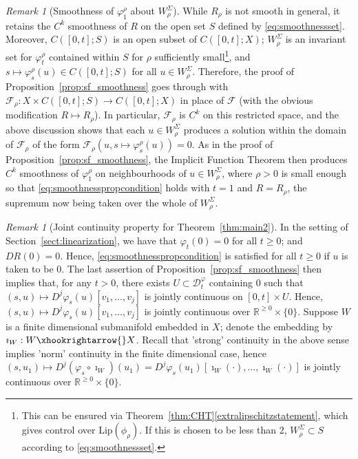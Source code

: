 \documentclass[a4paper, 12pt, oneside, reqno, notitlepage]{amsart}
\theoremstyle{plain}
\theoremstyle{definition}
\theoremstyle{remark}
\newtheorem{remark}[theorem]{Remark}
\newcommand{\lip}{\mathrm{Lip}}
\begin{document}
\begin{remark}[Smoothness of $\varphi_1^\rho$ about $W^\Sigma_\rho$] \label{remark:cutoff_semiflow_smoothness}
    While $R_\rho$ is not smooth in general, it retains the $C^k$ smoothness of $R$ on the open set $S$ defined by \eqref{eq:smoothnessset}.
    Moreover, $C([0,t];S)$ is an open subset of $C([0,t];X)$; $W^\Sigma_\rho$ is an invariant set for $\varphi_t^\rho$ contained within $S$ for $\rho$ sufficiently small\footnote{This can be ensured via Theorem~\ref{thm:CHT}\ref{extralipschitzstatement}, which gives control over $\lip(\phi_\rho)$. If this is chosen to be less than $2$, $W^\Sigma_\rho \subset S$ according to \eqref{eq:smoothnessset}.}, and $s \mapsto \varphi_s^\rho(u) \in C([0,t];S)$ for all $u \in W^\Sigma_\rho$. 
    Therefore, the proof of Proposition~\ref{prop:sf_smoothness} goes through with $\mathcal{F}_\rho : X \times C([0,t];S) \to C([0,t];X)$ in place of $\mathcal{F}$ (with the obvious modification $R \mapsto R_\rho$).
    In particular, $\mathcal{F}_\rho$ is $C^k$ on this restricted space, and the above discussion shows that each $u \in W^\Sigma_\rho$ produces a solution within the domain of $\mathcal{F}_\rho$ of the form $\mathcal{F}_\rho (u, s \mapsto \varphi^\rho_s(u)) =0$.
    As in the proof of Proposition~\ref{prop:sf_smoothness}, the Implicit Function Theorem then produces $C^k$ smoothness of $\varphi_1^\rho$ on neighbourhoods of $u \in W^\Sigma_\rho$, where $\rho >0$ is small enough so that \eqref{eq:smoothnesspropcondition} holds with $t =1 $ and $R = R_\rho$, the supremum now being taken over the whole of $W^\Sigma_\rho$.
\end{remark}


\begin{remark}[Joint continuity property for Theorem~\ref{thm:main2}] \label{remark:jointcont}
    In the setting of Section~\ref{sect:linearization}, we have that $\varphi_t(0) = 0$ for all $t \geq 0$; and $DR(0) = 0$.
    Hence, \eqref{eq:smoothnesspropcondition} is satisfied for all $t \geq 0$ if $u$ is taken to be $0$.
    The last assertion of Proposition~\ref{prop:sf_smoothness} then implies that, for any $t > 0$, there exists $U \subset \mathcal{D}_t^\varphi$ containing $0$ such that $(s,u) \mapsto D^j\varphi_s(u)[v_1,\ldots,v_j]$ is jointly continuous on $[0,t] \times U$.
    Hence,  $(s,u) \mapsto D^j\varphi_s(u)[v_1,\ldots,v_j]$ is jointly continuous over $\mathbb{R}^{\geq 0} \times \{0\}$.
    Suppose $W$ is a finite dimensional submanifold embedded in $X$; denote the embedding by $\imath_W: W \xhookrightarrow{} X$.
    Recall that 'strong' continuity in the above sense implies 'norm' continuity in the finite dimensional case, hence $(s,u_1) \mapsto D^j(\varphi_s \circ \imath_W )(u_1) = D^j \varphi_s (u_1) [\imath_W (\cdot),\ldots,\imath_W(\cdot)]$ is jointly continuous over $\mathbb{R}^{\geq 0} \times \{0\}$. 
\end{remark}
\end{document}

